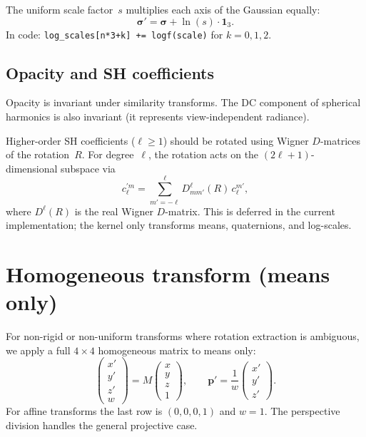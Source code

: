 \documentclass[11pt]{article}
\begin{document}
The uniform scale factor~$s$ multiplies each axis of the Gaussian equally:
\begin{equation}
  \boldsymbol{\sigma}' = \boldsymbol{\sigma} + \ln(s) \cdot \mathbf{1}_3.
\end{equation}
In code: \texttt{log\_scales[n*3+k] += logf(scale)} for $k = 0,1,2$.

\subsection{Opacity and SH coefficients}

Opacity is invariant under similarity transforms. The DC component of
spherical harmonics is also invariant (it represents view-independent radiance).

Higher-order SH coefficients ($\ell \geq 1$) should be rotated using Wigner
$D$-matrices of the rotation~$R$. For degree~$\ell$, the rotation acts on
the $(2\ell+1)$-dimensional subspace via
\begin{equation}
  c_\ell^{'m} = \sum_{m'=-\ell}^{\ell} D^{\ell}_{mm'}(R)\, c_\ell^{m'},
\end{equation}
where $D^\ell(R)$ is the real Wigner $D$-matrix. This is deferred in the
current implementation; the kernel only transforms means, quaternions, and
log-scales.

\section{Homogeneous transform (means only)}
\label{sec:homogeneous}

For non-rigid or non-uniform transforms where rotation extraction is ambiguous,
we apply a full $4 \times 4$ homogeneous matrix to means only:
\begin{equation}
  \begin{pmatrix} x' \\ y' \\ z' \\ w \end{pmatrix}
  = M \begin{pmatrix} x \\ y \\ z \\ 1 \end{pmatrix},
  \qquad
  \mathbf{p}' = \frac{1}{w}\begin{pmatrix} x' \\ y' \\ z' \end{pmatrix}.
\end{equation}
For affine transforms the last row is $(0,0,0,1)$ and $w = 1$. The
perspective division handles the general projective case.
\end{document}
